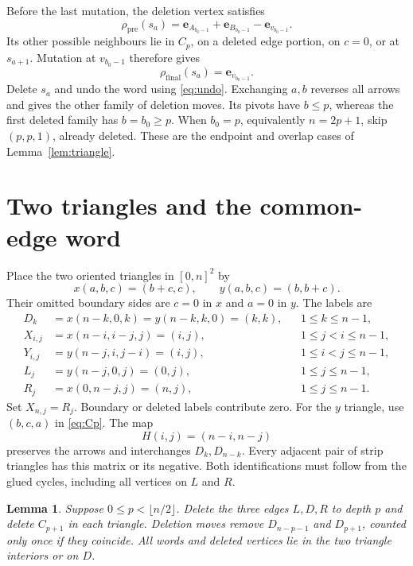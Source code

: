 \documentclass[11pt,a4paper]{article}
\newtheorem{lemma}{Lemma}
\newcommand{\e}{\mathbf e}
\begin{document}
Before the last mutation, the deletion vertex satisfies
\[
 \rho_{\mathrm{pre}}(s_a)=\e_{A_{b_0-1}}+\e_{B_{b_0-1}}-\e_{v_{b_0-1}}.
\]
Its other possible neighbours lie in $C_p$, on a deleted edge portion,
on $c=0$, or at $s_{a+1}$. Mutation at $v_{b_0-1}$ therefore gives
\begin{equation}\label{eq:triangle-final}
 \rho_{\mathrm{final}}(s_a)=\e_{v_{b_0-1}}.
\end{equation}
Delete $s_a$ and undo the word using \eqref{eq:undo}. Exchanging $a,b$
reverses all arrows and gives the other family of deletion moves.
Its pivots have $b\le p$, whereas the first deleted family has $b=b_0\ge p$.
When $b_0=p$, equivalently $n=2p+1$, skip $(p,p,1)$, already deleted.
These are the endpoint and overlap cases of Lemma~\ref{lem:triangle}.

\newpage
\section{Two triangles and the common-edge word}
Place the two oriented triangles in $[0,n]^2$ by
\[
 x(a,b,c)=(b+c,c),\qquad y(a,b,c)=(b,b+c).
\]
Their omitted boundary sides are $c=0$ in $x$ and $a=0$ in $y$.
The labels are
\begin{align*}
 D_k&=x(n-k,0,k)=y(n-k,k,0)=(k,k),&&1\le k\le n-1,\\
 X_{i,j}&=x(n-i,i-j,j)=(i,j),&&1\le j<i\le n-1,\\
 Y_{i,j}&=y(n-j,i,j-i)=(i,j),&&1\le i<j\le n-1,\\
 L_j&=y(n-j,0,j)=(0,j),&&1\le j\le n-1,\\
 R_j&=x(0,n-j,j)=(n,j),&&1\le j\le n-1.
\end{align*}
Set $X_{n,j}=R_j$. Boundary or deleted labels contribute zero.
For the $y$ triangle, use $(b,c,a)$ in \eqref{eq:Cp}.
The map
\begin{equation}\label{eq:halfturn}
 H(i,j)=(n-i,n-j)
\end{equation}
preserves the arrows and interchanges $D_k,D_{n-k}$.
Every adjacent pair of strip triangles has this matrix or its negative.
Both identifications must follow from the glued cycles, including all
vertices on $L$ and $R$.

\begin{lemma}\label{lem:edge}
Suppose $0\le p<\lfloor n/2\rfloor$. Delete the three edges $L,D,R$ to
depth $p$ and delete $C_{p+1}$ in each triangle. Deletion moves remove
$D_{n-p-1}$ and $D_{p+1}$, counted only once if they coincide.
All words and deleted vertices lie in the two triangle interiors or on $D$.
\end{lemma}
\end{document}
